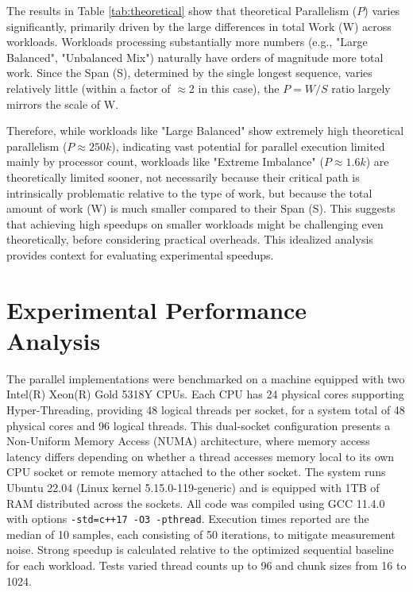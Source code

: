 \documentclass[10pt]{article}
\newcommand{\code}[1]{\texttt{#1}} %
\begin{document}
The results in Table \ref{tab:theoretical} show that theoretical Parallelism ($P$) varies significantly, primarily driven by the large differences in total Work (W) across workloads. Workloads processing substantially more numbers (e.g., "Large Balanced", "Unbalanced Mix") naturally have orders of magnitude more total work. Since the Span (S), determined by the single longest sequence, varies relatively little (within a factor of $\approx$2 in this case), the $P=W/S$ ratio largely mirrors the scale of W.

Therefore, while workloads like "Large Balanced" show extremely high theoretical parallelism ($P \approx 250k$), indicating vast potential for parallel execution limited mainly by processor count, workloads like "Extreme Imbalance" ($P \approx 1.6k$) are theoretically limited sooner, not necessarily because their critical path is intrinsically problematic relative to the type of work, but because the total amount of work (W) is much smaller compared to their Span (S). This suggests that achieving high speedups on smaller workloads might be challenging even theoretically, before considering practical overheads. This idealized analysis provides context for evaluating experimental speedups.
\section{Experimental Performance Analysis}

The parallel implementations were benchmarked on a machine equipped with two Intel(R) Xeon(R) Gold 5318Y CPUs. Each CPU has 24 physical cores supporting Hyper-Threading, providing 48 logical threads per socket, for a system total of 48 physical cores and 96 logical threads. This dual-socket configuration presents a Non-Uniform Memory Access (NUMA) architecture, where memory access latency differs depending on whether a thread accesses memory local to its own CPU socket or remote memory attached to the other socket. The system runs Ubuntu 22.04 (Linux kernel 5.15.0-119-generic) and is equipped with 1TB of RAM distributed across the sockets. All code was compiled using GCC 11.4.0 with options \code{-std=c++17 -O3 -pthread}. Execution times reported are the median of 10 samples, each consisting of 50 iterations, to mitigate measurement noise. Strong speedup is calculated relative to the optimized sequential baseline for each workload. Tests varied thread counts up to 96 and chunk sizes from 16 to 1024.
\end{document}
